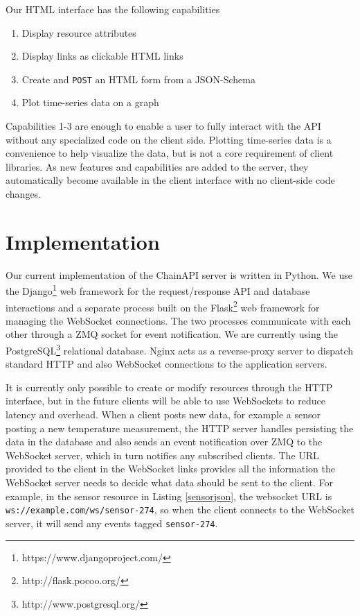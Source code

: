 \documentclass{acm_proc_article-sp}
\newenvironment{tightenumerate}{
    \vspace{-10pt}
    \begin{enumerate}
        \setlength{\parskip}{-1pt}}{
    \end{enumerate}
    \vspace{-10pt}}
\begin{document}
Our HTML interface has the following capabilities

\begin{tightenumerate}
    \item Display resource attributes
    \item Display links as clickable HTML links
    \item Create and \texttt{POST} an HTML form from a JSON-Schema
    \item Plot time-series data on a graph
\end{tightenumerate}

Capabilities 1-3 are enough to enable a user to fully interact with the API
without any specialized code on the client side. Plotting time-series data is a
convenience to help visualize the data, but is not a core requirement of client
libraries. As new features and capabilities are added to the server, they
automatically become available in the client interface with no client-side code
changes.

\section{Implementation}

Our current implementation of the ChainAPI server is written in Python. We use
the Django\footnote{https://www.djangoproject.com/} web framework for the
request/response API and database interactions and a separate process built on
the Flask\footnote{http://flask.pocoo.org/} web framework for managing the
WebSocket connections. The two processes communicate with each other through a
ZMQ socket for event notification. We are currently using the
PostgreSQL\footnote{http://www.postgresql.org/} relational database. Nginx acts
as a reverse-proxy server to dispatch standard HTTP and also WebSocket
connections to the application servers.

It is currently only possible to create or modify resources through the HTTP
interface, but in the future clients will be able to use WebSockets to reduce
latency and overhead. When a client posts new data, for example a sensor
posting a new temperature measurement, the HTTP server handles persisting the
data in the database and also sends an event notification over ZMQ to the
WebSocket server, which in turn notifies any subscribed clients. The URL
provided to the client in the WebSocket links provides all the information the
WebSocket server needs to decide what data should be sent to the client. For
example, in the sensor resource in Listing \ref{sensorjson}, the websocket URL
is \texttt{ws://example.com/ws/sensor-274}, so when the client connects to the
WebSocket server, it will send any events tagged \texttt{sensor-274}.
\end{document}
